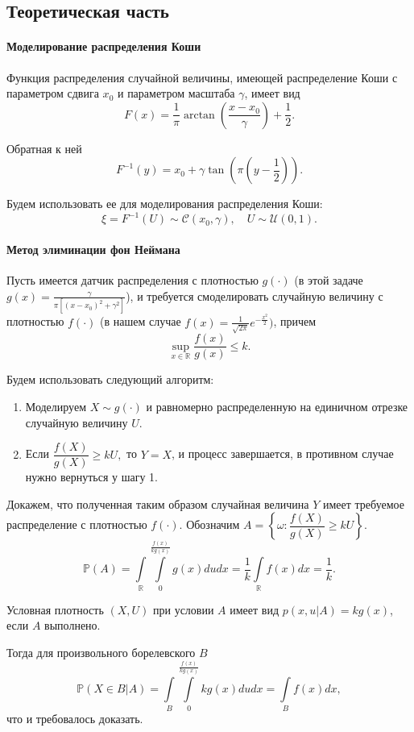 \documentclass[16pt]{article}
\newcommand\Real{\mathbb{R}}
\newcommand\A{(\cdot)}
\newcommand\Int[2]{\int\limits_{#1}^{#2}}
\newcommand{\Prb}{\mathbb{P}}
\begin{document}
\subsection{Теоретическая часть}
\paragraph{Моделирование распределения Коши}
Функция распределения случайной величины, имеющей распределение Коши с параметром сдвига $x_0$ и параметром масштаба $\gamma$, имеет вид
$$F(x) = \frac{1}{\pi} \arctan\left(\frac{x-x_0}{\gamma}\right) + \frac12.$$

Обратная к ней
$$F^{-1}(y) = x_0 + \gamma \tan\left(\pi\left(y - \frac12\right)\right).$$

Будем использовать ее для моделирования распределения Коши:
$$\xi = F^{-1}(U) \sim \mathcal{C}(x_0, \gamma), \quad U \sim \mathcal{U}(0, 1).$$

\paragraph{Метод элиминации фон Неймана}
Пусть имеется датчик распределения с плотностью $g(\cdot)$ (в этой задаче 
$g(x) = \frac{\gamma}{\pi[(x - x_0)^2 + \gamma^2]}$), и требуется смоделировать случайную величину с плотностью $f(\cdot)$ (в нашем случае $f(x) = \frac{1}{\sqrt{2\pi}}e^{-\frac{x^2}{2}})$, причем
$$\sup_{x \in \Real} \frac{f(x)}{g(x)} \leq k.$$

Будем использовать следующий алгоритм:
\begin{enumerate}
	\item Моделируем $X \sim g\A$ и равномерно распределенную на единичном отрезке случайную  величину $U$.
	\item Если $\dfrac{f(X)}{g(X)} \geq kU,$
то $Y = X$, и процесс завершается, в противном случае нужно вернуться у шагу 1.
\end{enumerate} 

Докажем, что полученная таким образом случайная величина $Y$ имеет требуемое распределение с плотностью $f\A$.
Обозначим $A = \left\{\omega\colon \dfrac{f(X)}{g(X)} \geq kU\right\}$.
$$\Prb(A) = \int\limits_\Real\Int{0}{\frac{f(x)}{kg(x)}}g(x)dudx = \dfrac{1}{k}\int\limits_\Real f(x)dx = \dfrac{1}{k}.$$

Условная плотность $(X, U)$ при условии $A$ имеет вид
$p(x, u | A) = kg(x)$, если $A$ выполнено.

Тогда для произвольного борелевского $B$
$$\Prb(X \in B | A) = \int\limits_B\Int{0}{\frac{f(x)}{kg(x)}}kg(x)dudx = \int\limits_B f(x) dx,$$
что и требовалось доказать.
\end{document}
